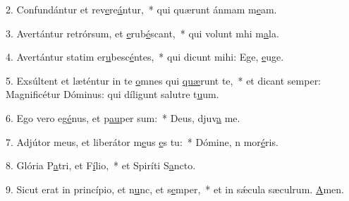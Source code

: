 2. Confundántur et rev\uline{e}re\uline{á}ntur,~* qui quærunt ánmam m\uline{e}am.\par 
3. Avertántur retrórsum, et \uline{e}rub\uline{é}scant,~* qui volunt mhi m\uline{a}la.\par 
4. Avertántur statim er\uline{u}besc\uline{é}ntes,~* qui dicunt mihi: Ege, \uline{e}uge.\par 
5. Exsúltent et læténtur in te \uline{o}mnes qui \uline{quæ}runt te,~* et dicant semper: Magnificétur Dóminus: qui díligunt salutre t\uline{u}um.\par 
6. Ego vero eg\uline{é}nus, et p\uline{au}per sum:~* Deus, djuv\uline{a} me.\par 
7. Adjútor meus, et liberátor m\uline{e}us \uline{e}s tu:~* Dómine, n mor\uline{é}ris.\par 
8. Glória P\uline{a}tri, et F\uline{í}lio,~* et Spiríti S\uline{a}ncto.\par 
9. Sicut erat in princípio, et n\uline{u}nc, et s\uline{e}mper,~* et in sǽcula sæculrum. \uline{A}men.\par 
